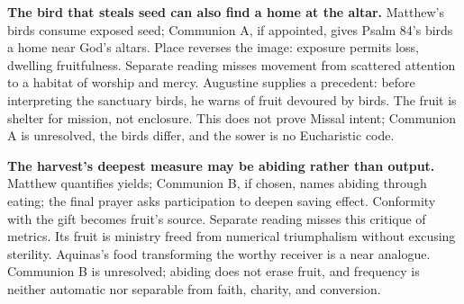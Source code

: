 \noindent\textbf{The bird that steals seed can also find a home at the altar.\enspace{}}
Matthew's birds consume exposed seed; Communion A, if appointed, gives Psalm 84's birds a home near God's altars. Place reverses the image: exposure permits loss, dwelling fruitfulness. Separate reading misses movement from scattered attention to a habitat of worship and mercy. Augustine supplies a precedent: before interpreting the sanctuary birds, he warns of fruit devoured by birds. The fruit is shelter for mission, not enclosure. This does not prove Missal intent; Communion A is unresolved, the birds differ, and the sower is no Eucharistic code.

\noindent\textbf{The harvest's deepest measure may be abiding rather than output.\enspace{}}
Matthew quantifies yields; Communion B, if chosen, names abiding through eating; the final prayer asks participation to deepen saving effect. Conformity with the gift becomes fruit's source. Separate reading misses this critique of metrics. Its fruit is ministry freed from numerical triumphalism without excusing sterility. Aquinas's food transforming the worthy receiver is a near analogue. Communion B is unresolved; abiding does not erase fruit, and frequency is neither automatic nor separable from faith, charity, and conversion.
